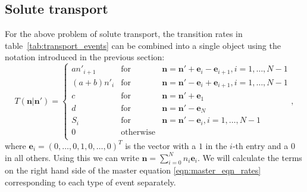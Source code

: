 \documentclass[a4paper,11pt]{article}
\numberwithin{equation}{section}
\newcommand{\V}[1]{\mathbf{#1}}
\begin{document}
\subsection{Solute transport}
For the above problem of solute transport, the transition rates in
table~\ref{tab:transport_events} can be combined into a single object using the
notation introduced in the previous section:
\begin{equation}
    \label{eqn:}
    T(\V{n}|\V{n}') = \left\{
        \begin{matrix}
            a n'_{i+1} & \text{for} & \V{n} = \V{n}' + \V{e}_i - \V{e}_{i+1},
            i=1,\dotsc,N-1\\
            (a+b) n'_i & \text{for} & \V{n} = \V{n}' - \V{e}_i + \V{e}_{i+1},
            i=1,\dotsc,N-1\\
            c & \text{for} & \V{n} = \V{n}' + \V{e}_1\\
            d & \text{for} & \V{n} = \V{n}' - \V{e}_N\\
            S_i & \text{for} & \V{n} = \V{n}' - \V{e}_i, i=1,\dotsc,N-1\\
            0 & \text{otherwise}\\
        \end{matrix}
        \right.,
\end{equation}
where \(\V{e}_i = (0,\dotsc,0,1,0,\dotsc,0)^T\) is the vector with a \(1\) in
the \(i\)-th entry and a \(0\) in all others. Using this we can write \(\V{n} =
\sum_{i=0}^{N} n_i \V{e}_i\). We will calculate the terms on the right hand side
of the master equation \eqref{eqn:master_eqn_rates} corresponding to each type
of event separately.
\end{document}
